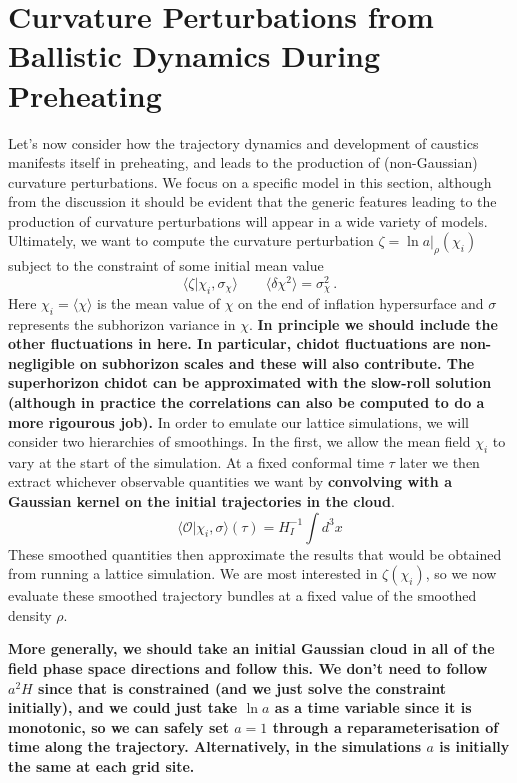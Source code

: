 \section{Curvature Perturbations from Ballistic Dynamics During Preheating}
Let's now consider how the trajectory dynamics and development of caustics manifests itself in preheating, and leads to the production of (non-Gaussian) curvature perturbations.
We focus on a specific model in this section, although from the discussion it should be evident that the generic features leading to the production of curvature perturbations will appear in a wide variety of models.
Ultimately, we want to compute the curvature perturbation $\zeta = \ln a|_{\rho}(\chi_i)$ subject to the constraint of some initial mean value
\begin{equation}
  \langle \zeta | \chi_i, \sigma_\chi \rangle \qquad \langle \delta\chi^2 \rangle = \sigma_\chi^2 \, .
\end{equation}
Here $\chi_i = \langle \chi \rangle$ is the mean value of $\chi$ on the end of inflation hypersurface and $\sigma$ represents the subhorizon variance in $\chi$.
{\bf In principle we should include the other fluctuations in here.  In particular, chidot fluctuations are non-negligible on subhorizon scales and these will also contribute.  The superhorizon chidot can be approximated with the slow-roll solution (although in practice the correlations can also be computed to do a more rigourous job).}
In order to emulate our lattice simulations, we will consider two hierarchies of smoothings.
In the first, we allow the mean field $\chi_i$ to vary at the start of the simulation.  At a fixed conformal time $\tau$ later we then extract whichever observable quantities we want by {\bf convolving with a Gaussian kernel on the initial trajectories in the cloud}.
\begin{equation}
  \langle\mathcal{O}|\chi_i,\sigma\rangle(\tau) = H_I^{-1}\int d^3x 
\end{equation}
These smoothed quantities then approximate the results that would be obtained from running a lattice simulation.
We are most interested in $\zeta(\chi_i)$, so we now evaluate these smoothed trajectory bundles at a fixed value of the smoothed density $\rho$.



    {\bf More generally, we should take an initial Gaussian cloud in all of the field phase space directions and follow this.  We don't need to follow $a^2H$ since that is constrained (and we just solve the constraint initially), and we could just take $\ln a$ as a time variable since it is monotonic, so we can safely set $a=1$ through a reparameterisation of time along the trajectory.  Alternatively, in the simulations $a$ is initially the same at each grid site.}

